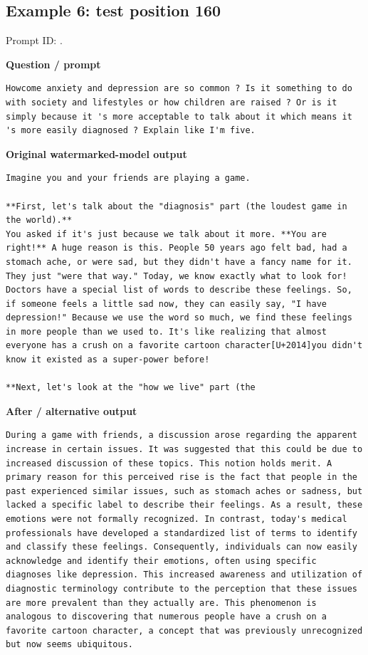 \subsection{Example 6: test position
160}\label{record-docs-watermarking-qualitative-text-textseal2-vanilla-md-example-6-test-position-160}

Prompt ID:
\texttt{}.

\textbf{Question / prompt}

\begin{Verbatim}
Howcome anxiety and depression are so common ? Is it something to do with society and lifestyles or how children are raised ? Or is it simply because it 's more acceptable to talk about it which means it 's more easily diagnosed ? Explain like I'm five.
\end{Verbatim}

\textbf{Original watermarked-model output}

\begin{Verbatim}
Imagine you and your friends are playing a game.

**First, let's talk about the "diagnosis" part (the loudest game in the world).**
You asked if it's just because we talk about it more. **You are right!** A huge reason is this. People 50 years ago felt bad, had a stomach ache, or were sad, but they didn't have a fancy name for it. They just "were that way." Today, we know exactly what to look for! Doctors have a special list of words to describe these feelings. So, if someone feels a little sad now, they can easily say, "I have depression!" Because we use the word so much, we find these feelings in more people than we used to. It's like realizing that almost everyone has a crush on a favorite cartoon character[U+2014]you didn't know it existed as a super-power before!

**Next, let's look at the "how we live" part (the
\end{Verbatim}

\textbf{After / alternative output}

\begin{Verbatim}
During a game with friends, a discussion arose regarding the apparent increase in certain issues. It was suggested that this could be due to increased discussion of these topics. This notion holds merit. A primary reason for this perceived rise is the fact that people in the past experienced similar issues, such as stomach aches or sadness, but lacked a specific label to describe their feelings. As a result, these emotions were not formally recognized. In contrast, today's medical professionals have developed a standardized list of terms to identify and classify these feelings. Consequently, individuals can now easily acknowledge and identify their emotions, often using specific diagnoses like depression. This increased awareness and utilization of diagnostic terminology contribute to the perception that these issues are more prevalent than they actually are. This phenomenon is analogous to discovering that numerous people have a crush on a favorite cartoon character, a concept that was previously unrecognized but now seems ubiquitous.
\end{Verbatim}

